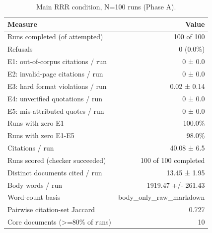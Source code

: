 \begin{table}[ht]
\centering
\caption{Main RRR condition, N=100 runs (Phase A).}
\begin{tabular}{lr}
\toprule
Measure & Value \\
\midrule
Runs completed (of attempted) & 100 of 100 \\
Refusals & 0 (0.0\%) \\
E1: out-of-corpus citations / run & 0 ± 0.0 \\
E2: invalid-page citations / run & 0 ± 0.0 \\
E3: hard format violations / run & 0.02 ± 0.14 \\
E4: unverified quotations / run & 0 ± 0.0 \\
E5: mis-attributed quotes / run & 0 ± 0.0 \\
Runs with zero E1 & 100.0\% \\
Runs with zero E1-E5 & 98.0\% \\
Citations / run & 40.08 ± 6.5 \\
Runs scored (checker succeeded) & 100 of 100 completed \\
Distinct documents cited / run & 13.45 ± 1.95 \\
Body words / run & 1919.47 +/- 261.43 \\
Word-count basis & body\_only\_raw\_markdown \\
Pairwise citation-set Jaccard & 0.727 \\
Core documents (>=80\% of runs) & 10 \\
\bottomrule
\end{tabular}
\end{table}
